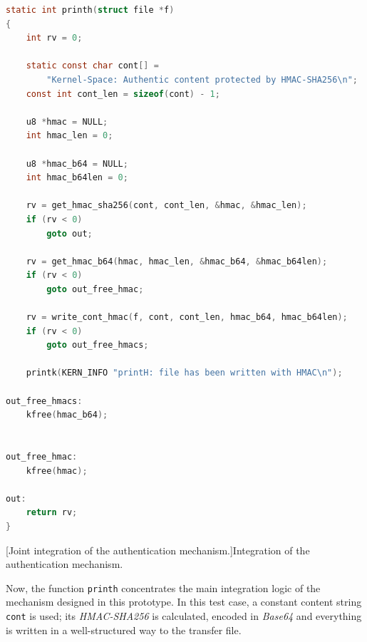 \begin{lstlisting}[language=C]
static int printh(struct file *f)
{
	int rv = 0;

	static const char cont[] =
		"Kernel-Space: Authentic content protected by HMAC-SHA256\n";
	const int cont_len = sizeof(cont) - 1;

	u8 *hmac = NULL;
	int hmac_len = 0;

	u8 *hmac_b64 = NULL;
	int hmac_b64len = 0;

	rv = get_hmac_sha256(cont, cont_len, &hmac, &hmac_len);
	if (rv < 0)
		goto out;

	rv = get_hmac_b64(hmac, hmac_len, &hmac_b64, &hmac_b64len);
	if (rv < 0)
		goto out_free_hmac;

	rv = write_cont_hmac(f, cont, cont_len, hmac_b64, hmac_b64len);
	if (rv < 0)
		goto out_free_hmacs;

	printk(KERN_INFO "printH: file has been written with HMAC\n");

out_free_hmacs:
	kfree(hmac_b64);


out_free_hmac:
	kfree(hmac);

out:
	return rv;
}
\end{lstlisting}
\captionsetup{type=code,justification=centering,singlelinecheck=false}
[Joint integration of the authentication mechanism.]{Integration of the authentication mechanism.}
\label{cod:crypto_printh}
\vspace{\baselineskip}

Now, the function \verb|printh| concentrates the main integration logic of the mechanism designed in this prototype.
In this test case, a constant content string \verb|cont| is used; its \textit{HMAC-SHA256} is calculated, encoded in \textit{Base64} and everything is written in a well-structured way to the transfer file.\\

\

